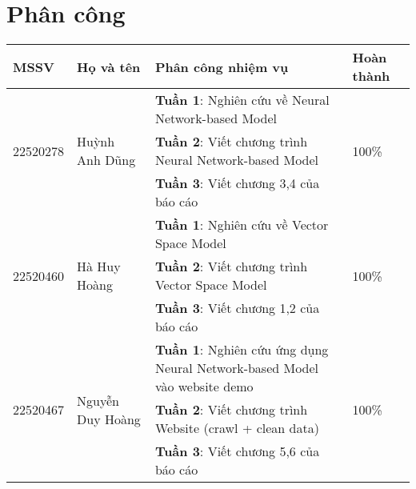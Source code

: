 \chapter*{Phân công}
\begin{tabularx}{\linewidth}{llXl}
	\toprule
	MSSV                         & Họ và tên                            & \raggedright Phân công nhiệm vụ                                                              & Hoàn thành                \\
	\midrule\midrule
	\multirow[t]{3}{*}{22520278} & \multirow[t]{3}{*}{Huỳnh Anh Dũng}   & \raggedright\textbf{Tuần 1}: Nghiên cứu về Neural Network-based Model                        & \multirow[t]{3}{*}{100\%} \\
	                             &                                      & \raggedright\textbf{Tuần 2}: Viết chương trình Neural Network-based Model                    &                           \\
	                             &                                      & \raggedright\textbf{Tuần 3}: Viết chương 3,4 của báo cáo                                     &                           \\
	\multirow[t]{3}{*}{22520460} & \multirow[t]{3}{*}{Hà Huy Hoàng}     & \raggedright\textbf{Tuần 1}: Nghiên cứu về Vector Space Model                                & \multirow[t]{3}{*}{100\%} \\
	                             &                                      & \raggedright\textbf{Tuần 2}: Viết chương trình Vector Space Model                            &                           \\
	                             &                                      & \raggedright\textbf{Tuần 3}: Viết chương 1,2 của báo cáo                                     &                           \\
	\multirow[t]{3}{*}{22520467} & \multirow[t]{3}{*}{Nguyễn Duy Hoàng} & \raggedright\textbf{Tuần 1}: Nghiên cứu ứng dụng Neural Network-based Model vào website demo & \multirow[t]{3}{*}{100\%} \\
	                             &                                      & \raggedright\textbf{Tuần 2}: Viết chương trình Website (crawl + clean data)                  &                           \\
	                             &                                      & \raggedright\textbf{Tuần 3}: Viết chương 5,6 của báo cáo                                     &                           \\
	\bottomrule
\end{tabularx}